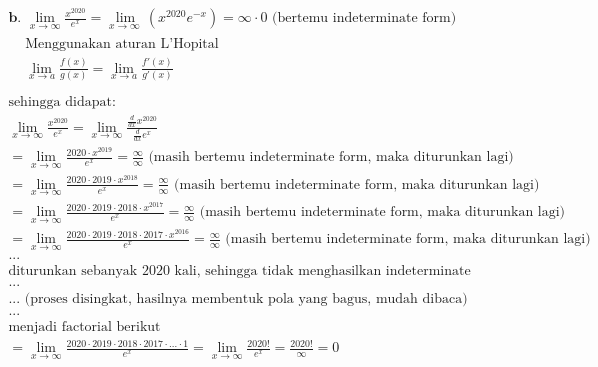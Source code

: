 \documentclass[12pt]{article}
\begin{document}
\begin{fleqn}[2em]
\begin{align*}
\boxed{
\begin{aligned}
  & \textbf{b. } \lim_{x \to \infty} \frac{x^{2020}}{e^x}
    = \lim_{x\to \infty \:}\left(x^{2020}e^{-x}\right)
    = \infty \cdot 0 \text{ (bertemu indeterminate form)} \\
  & \boxed{
    \begin{aligned}
      & \text{Menggunakan aturan L'Hopital} \\
      & \lim_{x \to a} \frac{f(x)}{g(x)} = \lim_{x \to a} \frac{f'(x)}{g'(x)} \\
    \end{aligned}
  } \\
  & \text{sehingga didapat: } \\
  & \lim_{x \to \infty} \frac{x^{2020}}{e^x}
    = \lim_{x \to \infty} \frac{\frac{d}{dx} x^{2020}}{\frac{d}{dx} e^x} \\
  & = \lim _{x\to \infty}\frac{2020 \cdot x^{2019}}{e^x} = \frac{\infty}{\infty}
    \text{ (masih bertemu indeterminate form, maka diturunkan lagi)} \\
  & = \lim _{x\to \infty}\frac{2020 \cdot 2019 \cdot x^{2018}}{e^x} = \frac{\infty}{\infty}
    \text{ (masih bertemu indeterminate form, maka diturunkan lagi)} \\
  & = \lim _{x\to \infty}\frac{2020 \cdot 2019 \cdot 2018 \cdot  x^{2017}}{e^x} = \frac{\infty}{\infty}
    \text{ (masih bertemu indeterminate form, maka diturunkan lagi)} \\
  & = \lim _{x\to \infty}\frac{2020 \cdot 2019 \cdot 2018 \cdot 2017 \cdot x^{2016}}{e^x} = \frac{\infty}{\infty}
    \text{ (masih bertemu indeterminate form, maka diturunkan lagi)} \\
  & ... \\
  & \text{diturunkan sebanyak 2020 kali, sehingga tidak menghasilkan indeterminate form lagi} \\
  & ... \\
  & ... \text{ (proses disingkat, hasilnya membentuk pola yang bagus, mudah dibaca)} \\
  & ... \\
  & \text{menjadi factorial berikut} \\
  & = \lim _{x\to \infty}\frac{2020 \cdot 2019 \cdot 2018 \cdot 2017 \cdot ... \cdot 1}{e^x}
    = \lim _{x\to \infty}\frac{2020!}{e^x}
    = \frac{2020!}{\infty} = 0
\end{aligned}
}
\end{align*}


\end{fleqn}
\end{document}
